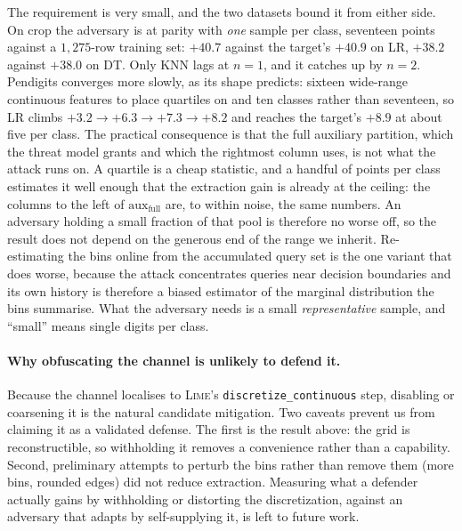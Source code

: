 \documentclass[sigconf,anonymous,review]{acmart}
\begin{document}
The requirement is very small, and the two datasets bound it from either side. On crop the adversary
is at parity with \emph{one} sample per class, seventeen points against a $1{,}275$-row training set:
$+40.7$ against the target's $+40.9$ on LR, $+38.2$ against $+38.0$ on DT. Only KNN lags at $n{=}1$,
and it catches up by $n{=}2$. Pendigits converges more slowly, as its shape predicts: sixteen
wide-range continuous features to place quartiles on and ten classes rather than seventeen, so LR
climbs $+3.2 \to +6.3 \to +7.3 \to +8.2$ and reaches the target's $+8.9$ at about five per class.
The practical consequence is that the full auxiliary partition, which the threat model grants and
which the rightmost column uses, is not what the attack runs on. A quartile is a cheap statistic, and
a handful of points per class estimates it well enough that the extraction gain is already at the
ceiling: the columns to the left of $\text{aux}_{\text{full}}$ are, to within noise, the same numbers.
An adversary holding a small fraction of that pool is therefore no worse off, so the result does not
depend on the generous end of the range we inherit. Re-estimating the bins online from the accumulated
query set is the one variant that does worse, because the attack concentrates queries near decision
boundaries and its own history is therefore a biased estimator of the marginal distribution the bins
summarise. What the adversary needs is a small \emph{representative} sample, and ``small'' means
single digits per class.



\paragraph{Why obfuscating the channel is unlikely to defend it.} Because the channel localises to \textsc{Lime}'s
\texttt{discretize\_continuous} step, disabling or coarsening it is the natural candidate mitigation.
Two caveats prevent us from claiming it as a validated defense. The first is the result above: the
grid is reconstructible, so withholding it removes a convenience rather than a capability. Second,
preliminary attempts to perturb the bins rather than remove them (more bins, rounded edges) did not
reduce extraction. Measuring what a defender actually gains by withholding or distorting the
discretization, against an adversary that adapts by self-supplying it, is left to future work.
\end{document}
